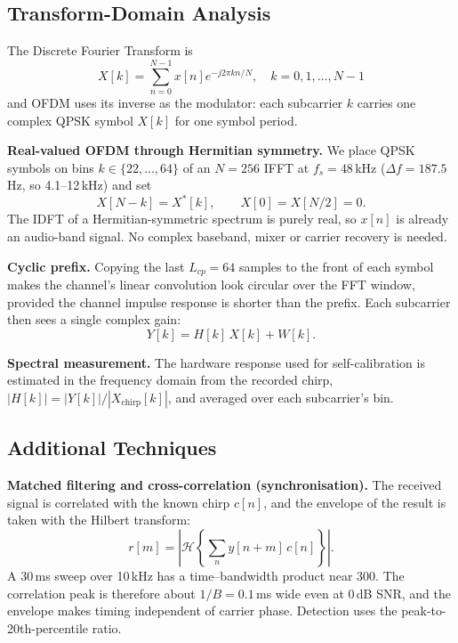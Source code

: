 \documentclass[11pt,a4paper]{report}
\begin{document}
\subsection{Transform-Domain Analysis}
The Discrete Fourier Transform is
\begin{equation}
X[k] = \sum_{n=0}^{N-1} x[n] e^{-j2\pi kn/N}, \quad k = 0, 1, \ldots, N-1
\end{equation}
and OFDM uses its inverse as the modulator: each subcarrier $k$ carries one complex
QPSK symbol $X[k]$ for one symbol period.

\textbf{Real-valued OFDM through Hermitian symmetry.} We place QPSK symbols on bins
$k\in\{22,\ldots,64\}$ of an $N=256$ IFFT at $f_s=48$\,kHz ($\Delta f=187.5$\,Hz, so
4.1--12\,kHz) and set
\begin{equation}
X[N-k] = X^*[k], \qquad X[0]=X[N/2]=0 .
\end{equation}
The IDFT of a Hermitian-symmetric spectrum is purely real, so $x[n]$ is already an
audio-band signal. No complex baseband, mixer or carrier recovery is needed.

\textbf{Cyclic prefix.} Copying the last $L_{cp}=64$ samples to the front of each
symbol makes the channel's linear convolution look circular over the FFT window,
provided the channel impulse response is shorter than the prefix. Each subcarrier
then sees a single complex gain:
\begin{equation}
Y[k] = H[k]\,X[k] + W[k].
\end{equation}

\textbf{Spectral measurement.} The hardware response used for self-calibration is
estimated in the frequency domain from the recorded chirp,
$|H[k]| = |Y[k]|/|X_{\text{chirp}}[k]|$, and averaged over each subcarrier's bin.

\subsection{Additional Techniques}

\textbf{Matched filtering and cross-correlation (synchronisation).} The received
signal is correlated with the known chirp $c[n]$, and the envelope of the result is
taken with the Hilbert transform:
\begin{equation}
r[m] = \left|\mathcal{H}\left\{\sum_n y[n+m]\,c[n]\right\}\right| .
\end{equation}
A 30\,ms sweep over 10\,kHz has a time--bandwidth product near 300. The correlation
peak is therefore about $1/B=0.1$\,ms wide even at 0\,dB SNR, and the envelope makes
timing independent of carrier phase. Detection uses the peak-to-20th-percentile
ratio.
\end{document}
